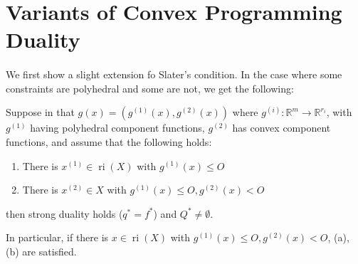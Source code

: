\section{Variants of Convex Programming Duality}
\label{sect:044}

\paragraph{}We first show a slight extension fo Slater's condition. In the case where some constraints are polyhedral and some are not, we get the following:

\begin{coro}\label{coro:044-slater-combined}
	Suppose in  that $g(x)=(g^{(1)}(x),g^{(2)}(x))$ where $g^{(i)}:\mathbb{R}^m\to \mathbb{R}^{r_i}$, with $g^{(1)}$ having polyhedral component functions, $g^{(2)}$ has convex component functions, and assume that the following holds:
	\begin{enumerate}[label=(\alph*)]
		\item There is $x^{(1)}\in \operatorname{ri}(X)$ with $g^{(1)}(x)\leq O$
		\item There is $x^{(2)}\in X$ with $g^{(1)}(x)\leq O,g^{(2)}(x)<O$
	\end{enumerate}
	then strong duality holds ($q^\ast=f^\ast$) and $Q^\ast\neq\emptyset$.
\end{coro}
In particular, if there is $x\in \operatorname{ri}(X)$ with $g^{(1)}(x)\leq O,g^{(2)}(x)< O$, (a), (b) are satisfied.

